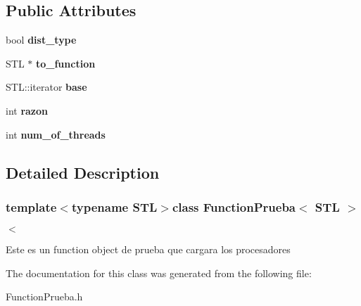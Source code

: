 \subsection*{Public Attributes}
\begin{DoxyCompactItemize}
\item 
\hypertarget{class_function_prueba_a9be1953b03cb653204cf10b1f2d6c5df}{bool {\bfseries dist\-\_\-type}}\label{class_function_prueba_a9be1953b03cb653204cf10b1f2d6c5df}

\item 
\hypertarget{class_function_prueba_afd6fedf6661db9b18f8f815abdf7ad1b}{S\-T\-L $\ast$ {\bfseries to\-\_\-function}}\label{class_function_prueba_afd6fedf6661db9b18f8f815abdf7ad1b}

\item 
\hypertarget{class_function_prueba_a738427545ba66c99252586d934bb4936}{S\-T\-L\-::iterator {\bfseries base}}\label{class_function_prueba_a738427545ba66c99252586d934bb4936}

\item 
\hypertarget{class_function_prueba_a47bd9740708d3d980150b32c12cbc067}{int {\bfseries razon}}\label{class_function_prueba_a47bd9740708d3d980150b32c12cbc067}

\item 
\hypertarget{class_function_prueba_a0f173b7655d0cd90c69902af6dfd70c1}{int {\bfseries num\-\_\-of\-\_\-threads}}\label{class_function_prueba_a0f173b7655d0cd90c69902af6dfd70c1}

\end{DoxyCompactItemize}


\subsection{Detailed Description}
\subsubsection*{template$<$typename S\-T\-L$>$class Function\-Prueba$<$ S\-T\-L $>$}

$<$

Este es un function object de prueba que cargara los procesadores 

The documentation for this class was generated from the following file\-:\begin{DoxyCompactItemize}
\item 
Function\-Prueba.\-h\end{DoxyCompactItemize}
